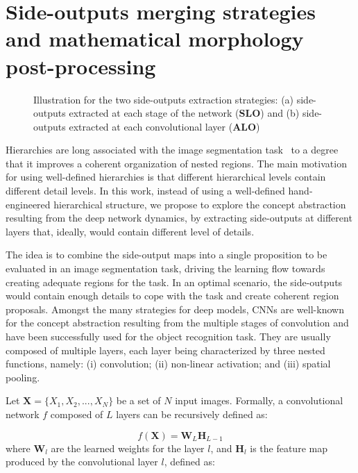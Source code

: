 \section{Side-outputs merging strategies and mathematical morphology post-processing}
\label{sec:method}


\begin{figure}[!t]
\centering
{}
\hfil
{}
\caption{Illustration for the two side-outputs extraction strategies:  (a) side-outputs extracted at each stage of the network (\textbf{SLO}) and (b) side-outputs extracted at each convolutional layer (\textbf{ALO})}
\label{fig:extraction}
\end{figure}

Hierarchies are long associated with the image segmentation task~\cite{jones97,cardelino06,najman12,xu16,cousty18} to a degree that it improves a coherent organization of nested regions. The main motivation for using well-defined hierarchies is that different hierarchical levels contain different detail levels. In this work, instead of using a well-defined hand-engineered hierarchical structure, we propose to explore the concept abstraction resulting from the deep network dynamics, by extracting side-outputs at different layers that, ideally, would contain different level of details.


The idea is to combine the side-output maps into a single proposition to be evaluated in an image segmentation task, driving the learning flow towards creating adequate regions for the task. In an optimal scenario, the side-outputs would contain enough details to cope with the task and create coherent region proposals. Amongst the many strategies for deep models, CNNs are well-known for the concept abstraction resulting from the multiple stages of convolution and have been successfully used for the object recognition task. They are usually composed of multiple layers, each layer being characterized by three nested functions, namely: (i) convolution; (ii) non-linear activation; and (iii) spatial pooling. 

Let $\mathbf{X}=\{X_1, X_2,...,X_N\}$ be a set of $N$ input images.
Formally, a convolutional network $\mathit{f}$ composed of $L$ layers can be recursively defined as:

\begin{equation}
\mathit{f}(\mathbf{X})=\mathbf{W}_L\mathbf{H}_{L-1}
\end{equation}
where $\mathbf{W}_l$ are the learned weights for the layer $l$, and $\mathbf{H}_l$ is the feature map produced by the convolutional layer $l$, defined as:

